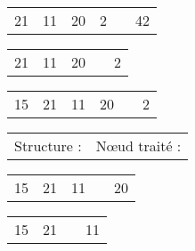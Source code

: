 \documentclass[11pt,a4paper]{article}
\begin{document}
\begin{center}
\begin{table}[ht!]
\begin{minipage}{0.45\textwidth}
\bigskip

\begin{tabular}{ |C{0.5cm}|C{0.5cm}|C{0.5cm}|C{0.5cm}| C{0.1cm} L{2cm} }
21 & 11 & 20 & 2 & & 42 \\
\end{tabular}

\bigskip

\begin{tabular}{ |C{0.5cm}|C{0.5cm}|C{0.5cm}| C{1cm} L{2cm} }
21 & 11 & 20 & & 2 \\
\end{tabular}

\bigskip

\begin{tabular}{ |C{0.5cm}|C{0.5cm}|C{0.5cm}|C{0.5cm}| C{0.1cm} L{2cm} }
15 & 21 & 11 & 20 & & 2 \\
\end{tabular}


  \end{minipage}
  \hfillx
  \begin{minipage}{0.01\textwidth}


  \end{minipage}
  \hfillx
  \begin{minipage}{0.45\textwidth}
    \centering

\begin{tabular}{ L{4cm} L{2.5cm} }
Structure : & N\oe{}ud traité : \\
\end{tabular}

\bigskip

\begin{tabular}{ |C{0.5cm}|C{0.5cm}|C{0.5cm}| C{1cm} L{2cm} }
15 & 21 & 11 & & 20 \\
\end{tabular}

\bigskip

\begin{tabular}{ |C{0.5cm}|C{0.5cm}| C{2cm} L{2cm} }
15 & 21 & & 11 \\
\end{tabular}

\bigskip


\end{minipage}
\end{table}
\end{center}
\end{document}
